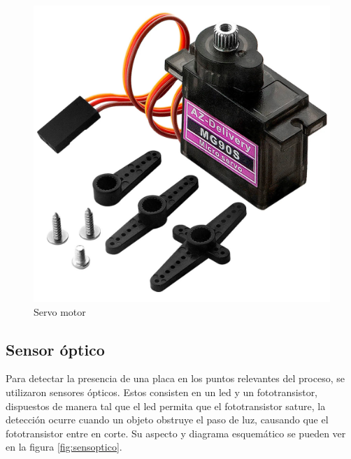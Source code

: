 \documentclass[12pt,letterpaper]{article}     %
\begin{document}
\begin{figure}[!ht]
\centering
\includegraphics[scale=0.15]{imagenes/servo.jpg}
\caption{Servo motor}
\label{fig:servo}
\end{figure}

\subsection{Sensor óptico}

Para detectar la presencia de una placa en los puntos relevantes del proceso, se utilizaron sensores ópticos.
Estos consisten en un led y un fototransistor, dispuestos de manera tal que el led permita que el fototransistor
sature, la detección ocurre cuando un objeto obstruye el paso de luz, causando que el fototransistor entre en
corte. Su aspecto y diagrama esquemático se pueden ver en la figura \ref{fig:sensoptico}.
\end{document}
